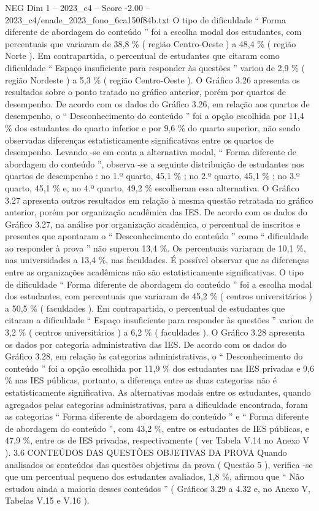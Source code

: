 \begin{textsample}{NEG Dim 1 – 2023\_c4 – Score -2.00 – 2023\_c4/enade\_2023\_fono\_6ca150f84b.txt}
O tipo de dificuldade “ Forma diferente de abordagem do conteúdo ” foi a escolha modal dos estudantes, com percentuais que variaram de 38,8 \% ( região Centro-Oeste ) a 48,4 \% ( região Norte ).
Em contrapartida, o percentual de estudantes que citaram como dificuldade “ Espaço insuficiente para responder às questões ” variou de 2,9 \% ( região Nordeste ) a 5,3 \% ( região Centro-Oeste ).
O Gráfico 3.26 apresenta os resultados sobre o ponto tratado no gráfico anterior, porém por quartos de desempenho.
De acordo com os dados do Gráfico 3.26, em relação aos quartos de desempenho, o “ Desconhecimento do conteúdo ” foi a opção escolhida por 11,4 \% dos estudantes do quarto inferior e por 9,6 \% do quarto superior, não sendo observadas diferenças estatisticamente significativas entre os quartos de desempenho.
Levando -se em conta a alternativa modal, “ Forma diferente de abordagem do conteúdo ”, observa -se a seguinte distribuição de estudantes nos quartos de desempenho : no 1.º quarto, 45,1 \% ; no 2.º quarto, 45,1 \% ; no 3.º quarto, 45,1 \% e, no 4.º quarto, 49,2 \% escolheram essa alternativa.
O Gráfico 3.27 apresenta outros resultados em relação à mesma questão retratada no gráfico anterior, porém por organização acadêmica das IES.
De acordo com os dados do Gráfico 3.27, na análise por organização acadêmica, o percentual de inscritos e presentes que apontaram o “ Desconhecimento do conteúdo ” como “ dificuldade ao responder à prova ” não superou 13,4 \%.
Os percentuais variaram de 10,1 \%, nas universidades a 13,4 \%, nas faculdades.
É possível observar que as diferenças entre as organizações acadêmicas não são estatisticamente significativas.
O tipo de dificuldade “ Forma diferente de abordagem do conteúdo ” foi a escolha modal dos estudantes, com percentuais que variaram de 45,2 \% ( centros universitários ) a 50,5 \% ( faculdades ).
Em contrapartida, o percentual de estudantes que citaram a dificuldade “ Espaço insuficiente para responder às questões ” variou de 3,2 \% ( centros universitários ) a 6,2 \% ( faculdades ).
O Gráfico 3.28 apresenta os dados por categoria administrativa das IES.
De acordo com os dados do Gráfico 3.28, em relação às categorias administrativas, o “ Desconhecimento do conteúdo ” foi a opção escolhida por 11,9 \% dos estudantes nas IES privadas e 9,6 \% nas IES públicas, portanto, a diferença entre as duas categorias não é estatisticamente significativa.
As alternativas modais entre os estudantes, quando agregados pelas categorias administrativas, para a dificuldade encontrada, foram as categorias “ Forma diferente de abordagem do conteúdo ” e “ Forma diferente de abordagem do conteúdo ”, com 43,2 \%, entre os estudantes de IES públicas, e 47,9 \%, entre os de IES privadas, respectivamente ( ver Tabela V.14 no Anexo V ). 3.6 CONTEÚDOS DAS QUESTÕES OBJETIVAS DA PROVA Quando analisados os conteúdos das questões objetivas da prova ( Questão 5 ), verifica -se que um percentual pequeno dos estudantes avaliados, 1,8 \%, afirmou que “ Não estudou ainda a maioria desses conteúdos ” ( Gráficos 3.29 a 4.32 e, no Anexo V, Tabelas V.15 e V.16 ).

\end{textsample}

